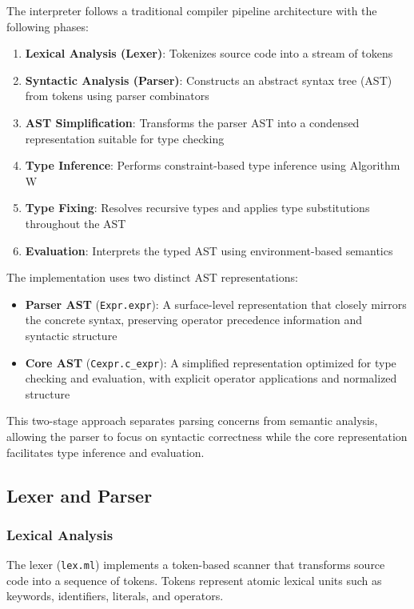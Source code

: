 \documentclass[conference,onecolumn]{IEEEtran}
\begin{document}
The interpreter follows a traditional compiler pipeline architecture with the following phases:

\begin{enumerate}
\item \textbf{Lexical Analysis (Lexer)}: Tokenizes source code into a stream of tokens
\item \textbf{Syntactic Analysis (Parser)}: Constructs an abstract syntax tree (AST) from tokens using parser combinators
\item \textbf{AST Simplification}: Transforms the parser AST into a condensed representation suitable for type checking
\item \textbf{Type Inference}: Performs constraint-based type inference using Algorithm W
\item \textbf{Type Fixing}: Resolves recursive types and applies type substitutions throughout the AST
\item \textbf{Evaluation}: Interprets the typed AST using environment-based semantics
\end{enumerate}

The implementation uses two distinct AST representations:

\begin{itemize}
\item \textbf{Parser AST} (\texttt{Expr.expr}): A surface-level representation that closely mirrors the concrete syntax, preserving operator precedence information and syntactic structure
\item \textbf{Core AST} (\texttt{Cexpr.c\_expr}): A simplified representation optimized for type checking and evaluation, with explicit operator applications and normalized structure
\end{itemize}

This two-stage approach separates parsing concerns from semantic analysis, allowing the parser to focus on syntactic correctness while the core representation facilitates type inference and evaluation.

\subsection{Lexer and Parser}

\subsubsection{Lexical Analysis}

The lexer (\texttt{lex.ml}) implements a token-based scanner that transforms source code into a sequence of tokens. Tokens represent atomic lexical units such as keywords, identifiers, literals, and operators.
\end{document}
